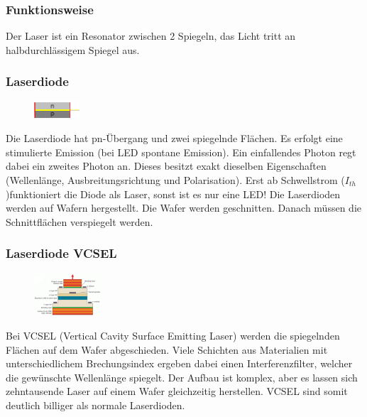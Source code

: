 \subsubsection{Funktionsweise}
Der Laser ist ein Resonator zwischen 2 Spiegeln, das Licht tritt an halbdurchlässigem Spiegel aus.

\subsubsection{Laserdiode}
\begin{figure}
    \centering
    \includegraphics[width=0.15\textwidth]{images/laserdiode}
\end{figure}
Die Laserdiode hat pn-Übergang und zwei spiegelnde Flächen. Es erfolgt eine stimulierte Emission (bei LED spontane Emission). Ein einfallendes Photon regt dabei ein zweites Photon an. Dieses besitzt exakt dieselben Eigenschaften (Wellenlänge, Ausbreitungsrichtung und Polarisation). Erst ab Schwellstrom ($I_{th}$)funktioniert die Diode als Laser, sonst ist es nur eine LED! Die Laserdioden werden auf Wafern hergestellt. Die Wafer werden geschnitten. Danach müssen die Schnittflächen verspiegelt werden. 

\subsubsection{Laserdiode VCSEL}
\begin{figure}
    \centering
    \includegraphics[width=0.22\textwidth]{images/vcsel}
\end{figure}
Bei VCSEL (Vertical Cavity Surface Emitting Laser) werden die spiegelnden Flächen auf dem Wafer abgeschieden. Viele Schichten aus Materialien mit unterschiedlichem Brechungsindex ergeben dabei einen Interferenzfilter, welcher die gewünschte Wellenlänge spiegelt. Der Aufbau ist komplex, aber es lassen sich zehntausende Laser auf einem Wafer gleichzeitig herstellen. VCSEL sind somit deutlich billiger als normale Laserdioden.




